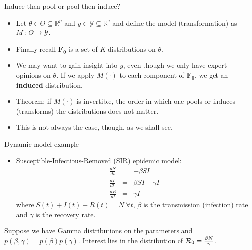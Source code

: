 \begin{frame}{Induce-then-pool or pool-then-induce?}
\begin{itemize}
 \item Let $\theta \in \Theta \subseteq \mathbb{R}^p$ and $y \in \mathcal{Y} \subseteq \mathbb{R}^p$ and define the model (transformation) as $M \,:\, \Theta \to \mathcal{Y}$.
 \item Finally recall $\mathbf{F_\theta}$ is a set of $K$ distributions on $\theta$.
 \item We may want to gain insight into $y$, even though we only have expert opinions on $\theta$.
 If we apply $M(\cdot)$ to each component of $\mathbf{F_\theta}$, we get an \textbf{induced} distribution.
 \item Theorem: if $M(\cdot)$ is invertible, the order in which one pools or induces (transforms) the distributions does not matter.
 \item This is not always the case, though, as we shall see.
\end{itemize}
\end{frame}
\begin{frame}{Dynamic model example}
\begin{itemize}
 \item Susceptible-Infectious-Removed (SIR) epidemic model:
 \begin{eqnarray*}
\frac{dS}{dt}&=& - \beta SI\\
\frac{dI}{dt}&=&  \beta SI - \gamma I\\
\frac{dR}{dt}&=& \gamma I 
\end{eqnarray*} 
where  $S(t) + I(t) + R(t) = N \; \forall t$, $\beta$ is the transmission (infection) rate and $\gamma$ is the recovery rate.
\end{itemize}
Suppose we have Gamma distributions on the parameters and $p(\beta, \gamma) = p(\beta)p(\gamma)$.
Interest lies in the distribution of ${\cal R}_0 = \frac{\beta N}{\gamma}$.
\end{frame}
